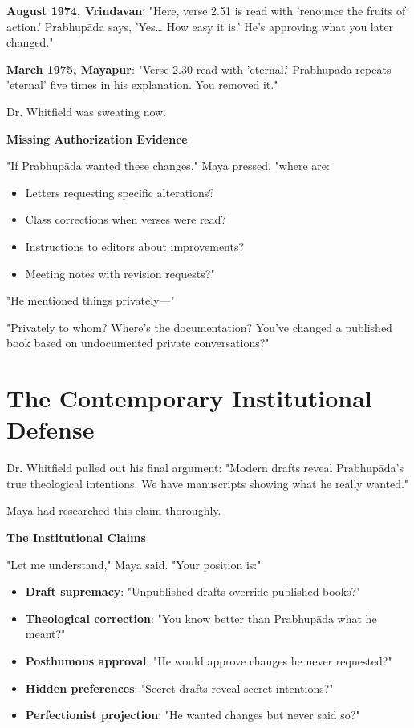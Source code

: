 \documentclass[11pt,twoside]{book}
\begin{document}
\textbf{\textbf{August 1974, Vrindavan}}: "Here, verse 2.51 is read with 'renounce the fruits of action.' Prabhupāda says, 'Yes\ldots{} How easy it is.' He's approving what you later changed."

\textbf{\textbf{March 1975, Mayapur}}: "Verse 2.30 read with 'eternal.' Prabhupāda repeats 'eternal' five times in his explanation. You removed it."

Dr. Whitfield was sweating now.

\textbf{\textbf{Missing Authorization Evidence}}

"If Prabhupāda wanted these changes," Maya pressed, "where are:
\begin{itemize}
\item Letters requesting specific alterations?
\item Class corrections when verses were read?
\item Instructions to editors about improvements?
\item Meeting notes with revision requests?"
\end{itemize}

"He mentioned things privately—"

"Privately to whom? Where's the documentation? You've changed a published book based on undocumented private conversations?"
\section*{The Contemporary Institutional Defense}
\label{sec:orgfaf8ab0}

Dr. Whitfield pulled out his final argument: "Modern drafts reveal Prabhupāda's true theological intentions. We have manuscripts showing what he really wanted."

Maya had researched this claim thoroughly.

\textbf{\textbf{The Institutional Claims}}

"Let me understand," Maya said. "Your position is:"

\begin{itemize}
\item \textbf{\textbf{Draft supremacy}}: "Unpublished drafts override published books?"
\item \textbf{\textbf{Theological correction}}: "You know better than Prabhupāda what he meant?"
\item \textbf{\textbf{Posthumous approval}}: "He would approve changes he never requested?"
\item \textbf{\textbf{Hidden preferences}}: "Secret drafts reveal secret intentions?"
\item \textbf{\textbf{Perfectionist projection}}: "He wanted changes but never said so?"
\end{itemize}
\end{document}
